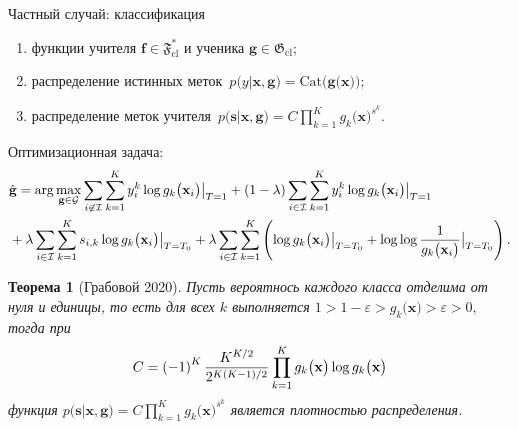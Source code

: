 \documentclass[10pt,pdf,hyperref={unicode}]{beamer}
\newtheorem{rustheorem}{Теорема}
\begin{document}
\begin{frame}{Частный случай: классификация}
\justifying
\begin{enumerate}
	\item функции учителя $\mathbf{f}\in\mathfrak{F}_{\text{cl}}^{*}$ и ученика $\mathbf{g}\in\mathfrak{G}_{\text{cl}}$;
	\item распределение истинных меток~$p\bigr(y|\mathbf{x}, \mathbf{g}\bigr) = \text{Cat}\bigr(\mathbf{g}\bigr(\mathbf{x}\bigr)\bigr)$;
	\item распределение меток учителя~$p\bigr(\mathbf{s}|\mathbf{x}, \mathbf{g}\bigr) = C\prod_{k=1}^{K}g_k\bigr(\mathbf{x}\bigr)^{s^k}.$
\end{enumerate}
Оптимизационная задача:
\[
\setlength\abovedisplayskip{0pt}
\begin{aligned}
&\hat{\mathbf{g}} = \arg\max_{\mathbf{g}\in \mathcal{G}} \sum_{i\not\in \mathcal{I}}\sum_{k=1}^{K}y_i^k\log g_k\bigr(\mathbf{x}_i\bigr)\bigr|_{T=1} 
+ \left(1-\lambda\right)\sum_{i\in \mathcal{I}}\sum_{k=1}^{K}y_i^k\log g_k\bigr(\mathbf{x}_i\bigr)\bigr|_{T=1} \\
&+ \lambda\sum_{i\in \mathcal{I}}\sum_{k=1}^{K}s_{i,k}\log g_k\bigr(\mathbf{x}_i\bigr)\bigr|_{T=T_0} 
+ \lambda \sum_{i\in \mathcal{I}}\sum_{k=1}^{K}\left(\log g_k\bigr(\mathbf{x}_i\bigr)\bigr|_{T=T_0} + \log\log\frac{1}{g_k\bigr(\mathbf{x}_i\bigr)}\bigr|_{T=T_0}\right).
\end{aligned}
\setlength\belowdisplayskip{0pt}
\]

\begin{rustheorem}[Грабовой 2020]
\label{theorem:st:dist}
Пусть вероятнось каждого класса отделима от нуля и единицы, то есть для всех $k$ выполняется $1 > 1- \varepsilon > g_k\bigr(\mathbf{x}\bigr) > \varepsilon > 0,$ тогда при
\[
\setlength\abovedisplayskip{0pt}
C=\left(-1\right)^{K}\frac{K^{K/2}}{2^{K(K-1)/2}}\prod_{k=1}^{K}g_k\bigr(\mathbf{x}\bigr)\log g_k\bigr(\mathbf{x}\bigr)
\setlength\belowdisplayskip{0pt}
\]
функция $p\bigr(\mathbf{s}|\mathbf{x}, \mathbf{g}\bigr) = C\prod_{k=1}^{K}g_k\bigr(\mathbf{x}\bigr)^{s^k}$ является плотностью распределения.
\end{rustheorem}

\end{frame}
\end{document}

